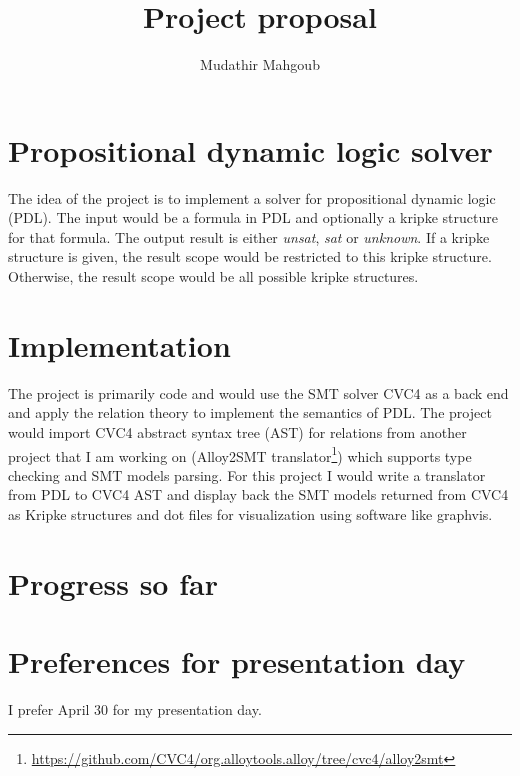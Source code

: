 \documentclass[12pt,a4paper]{article}
\author{Mudathir Mahgoub}
\title{Project proposal}
\begin{document}
\maketitle

\section{Propositional dynamic logic solver}
The idea of the project is to implement a solver for propositional dynamic logic (PDL). The input would be a formula in PDL and optionally a kripke structure for that formula. The output result is either \textit{unsat}, \textit{sat} or \textit{unknown}. If a kripke structure is given, the result scope would be restricted to this kripke structure. Otherwise, the result scope would be all possible kripke structures. 

\section{Implementation}
The project is primarily code and would use the SMT solver CVC4 as a back end and apply the relation theory to implement the semantics of PDL. The project would import CVC4 abstract syntax tree (AST) for relations from another project that I am working on (Alloy2SMT translator\footnote{\url{https://github.com/CVC4/org.alloytools.alloy/tree/cvc4/alloy2smt}}) which supports type checking and SMT models parsing. For this project I would write a translator from PDL to CVC4 AST and display back the SMT models returned from CVC4 as Kripke structures and dot files for visualization using software like graphvis.

\section{Progress so far}

\section{Preferences for presentation day}
I prefer April 30 for my presentation day.
\end{document}
